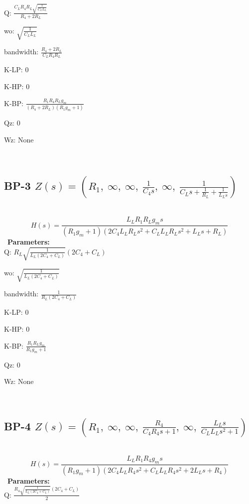 \documentclass{article}
\begin{document}
Q: $\frac{C_{L} R_{4} R_{L} \sqrt{\frac{1}{C_{L} L_{L}}}}{R_{4} + 2 R_{L}}$\ 

wo: $\sqrt{\frac{1}{C_{L} L_{L}}}$\ 

bandwidth: $\frac{R_{4} + 2 R_{L}}{C_{L} R_{4} R_{L}}$\ 

K-LP: $0$\ 

K-HP: $0$\ 

K-BP: $\frac{R_{1} R_{4} R_{L} g_{m}}{\left(R_{4} + 2 R_{L}\right) \left(R_{1} g_{m} + 1\right)}$\ 

Qz: $0$\ 

Wz: $\text{None}$\ 

\ 

\subsection{BP-3 $Z(s) = \left( R_{1}, \  \infty, \  \infty, \  \frac{1}{C_{4} s}, \  \infty, \  \frac{1}{C_{L} s + \frac{1}{R_{L}} + \frac{1}{L_{L} s}}\right)$ } \ 
\textbf{\[H(s) = \frac{L_{L} R_{1} R_{L} g_{m} s}{\left(R_{1} g_{m} + 1\right) \left(2 C_{4} L_{L} R_{L} s^{2} + C_{L} L_{L} R_{L} s^{2} + L_{L} s + R_{L}\right)}\] } \ 
\textbf{Parameters:}\\ 

Q: $R_{L} \sqrt{\frac{1}{L_{L} \left(2 C_{4} + C_{L}\right)}} \left(2 C_{4} + C_{L}\right)$\ 

wo: $\sqrt{\frac{1}{L_{L} \left(2 C_{4} + C_{L}\right)}}$\ 

bandwidth: $\frac{1}{R_{L} \left(2 C_{4} + C_{L}\right)}$\ 

K-LP: $0$\ 

K-HP: $0$\ 

K-BP: $\frac{R_{1} R_{L} g_{m}}{R_{1} g_{m} + 1}$\ 

Qz: $0$\ 

Wz: $\text{None}$\ 

\ 

\subsection{BP-4 $Z(s) = \left( R_{1}, \  \infty, \  \infty, \  \frac{R_{4}}{C_{4} R_{4} s + 1}, \  \infty, \  \frac{L_{L} s}{C_{L} L_{L} s^{2} + 1}\right)$ } \ 
\textbf{\[H(s) = \frac{L_{L} R_{1} R_{4} g_{m} s}{\left(R_{1} g_{m} + 1\right) \left(2 C_{4} L_{L} R_{4} s^{2} + C_{L} L_{L} R_{4} s^{2} + 2 L_{L} s + R_{4}\right)}\] } \ 
\textbf{Parameters:}\\ 

Q: $\frac{R_{4} \sqrt{\frac{1}{L_{L} \left(2 C_{4} + C_{L}\right)}} \left(2 C_{4} + C_{L}\right)}{2}$\ 
\end{document}
